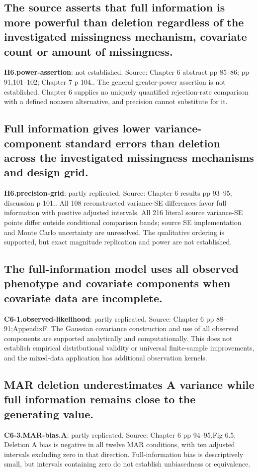 \documentclass[11pt]{article}
\begin{document}
\subsection{The source asserts that full information is more powerful than deletion regardless of the investigated missingness mechanism, covariate count or amount of missingness.}
\textbf{H6.power-assertion}: not established. Source: Chapter 6 abstract pp 85--86; pp 91,101--102; Chapter 7 p 104.. The general greater-power assertion is not established. Chapter 6 supplies no uniquely quantified rejection-rate comparison with a defined nonzero alternative, and precision cannot substitute for it.
\subsection{Full information gives lower variance-component standard errors than deletion across the investigated missingness mechanisms and design grid.}
\textbf{H6.precision-grid}: partly replicated. Source: Chapter 6 results pp 93--95; discussion p 101.. All 108 reconstructed variance-SE differences favor full information with positive adjusted intervals. All 216 literal source variance-SE points differ outside conditional comparison bands; source SE implementation and Monte Carlo uncertainty are unresolved. The qualitative ordering is supported, but exact magnitude replication and power are not established.
\subsection{The full-information model uses all observed phenotype and covariate components when covariate data are incomplete.}
\textbf{C6-1.observed-likelihood}: partly replicated. Source: Chapter 6 pp 88--91;AppendixF. The Gaussian covariance construction and use of all observed components are supported analytically and computationally. This does not establish empirical distributional validity or universal finite-sample improvements, and the mixed-data application has additional observation kernels.
\subsection{MAR deletion underestimates A variance while full information remains close to the generating value.}
\textbf{C6-3.MAR-bias.A}: partly replicated. Source: Chapter 6 pp 94--95,Fig 6.5. Deletion A bias is negative in all twelve MAR conditions, with ten adjusted intervals excluding zero in that direction. Full-information bias is descriptively small, but intervals containing zero do not establish unbiasedness or equivalence.
\end{document}
